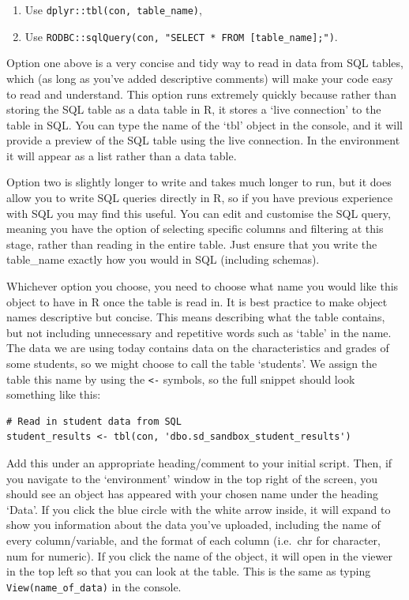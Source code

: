 \documentclass[
  12pt,
]{article}
\begin{document}
\begin{enumerate}
\def\labelenumi{\arabic{enumi}.}
\item
  Use \texttt{dplyr::tbl(con,\ table\_name)},
\item
  Use
  \texttt{RODBC::sqlQuery(con,\ "SELECT\ *\ FROM\ {[}table\_name{]};")}.
\end{enumerate}

Option one above is a very concise and tidy way to read in data from SQL
tables, which (as long as you've added descriptive comments) will make
your code easy to read and understand. This option runs extremely
quickly because rather than storing the SQL table as a data table in R,
it stores a `live connection' to the table in SQL. You can type the name
of the `tbl' object in the console, and it will provide a preview of the
SQL table using the live connection. In the environment it will appear
as a list rather than a data table.

Option two is slightly longer to write and takes much longer to run, but
it does allow you to write SQL queries directly in R, so if you have
previous experience with SQL you may find this useful. You can edit and
customise the SQL query, meaning you have the option of selecting
specific columns and filtering at this stage, rather than reading in the
entire table. Just ensure that you write the table\_name exactly how you
would in SQL (including schemas).

Whichever option you choose, you need to choose what name you would like
this object to have in R once the table is read in. It is best practice
to make object names descriptive but concise. This means describing what
the table contains, but not including unnecessary and repetitive words
such as `table' in the name. The data we are using today contains data
on the characteristics and grades of some students, so we might choose
to call the table `students'. We assign the table this name by using the
\texttt{\textless{}-} symbols, so the full snippet should look something
like this:

\begin{verbatim}
# Read in student data from SQL
student_results <- tbl(con, 'dbo.sd_sandbox_student_results')
\end{verbatim}

Add this under an appropriate heading/comment to your initial script.
Then, if you navigate to the `environment' window in the top right of
the screen, you should see an object has appeared with your chosen name
under the heading `Data'. If you click the blue circle with the white
arrow inside, it will expand to show you information about the data
you've uploaded, including the name of every column/variable, and the
format of each column (i.e.~chr for character, num for numeric). If you
click the name of the object, it will open in the viewer in the top left
so that you can look at the table. This is the same as typing
\texttt{View(name\_of\_data)} in the console.
\end{document}
